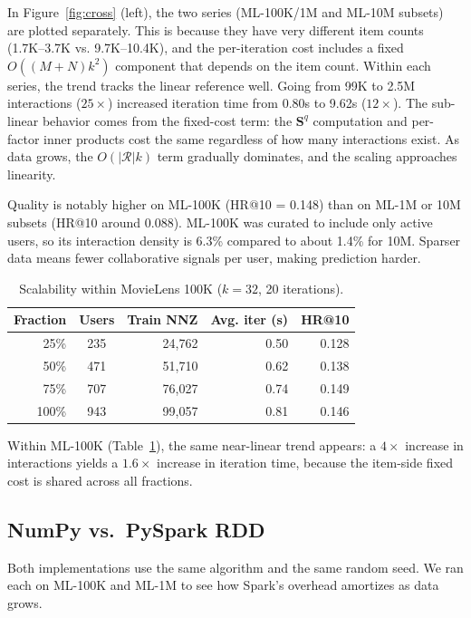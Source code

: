 \documentclass[11pt,a4paper]{article}
\begin{document}
In Figure~\ref{fig:cross} (left), the two series (ML-100K/1M and ML-10M subsets) are plotted separately. This is because they have very different item counts (1.7K--3.7K vs. 9.7K--10.4K), and the per-iteration cost includes a fixed $O((M+N)k^2)$ component that depends on the item count. Within each series, the trend tracks the linear reference well. Going from 99K to 2.5M interactions ($25\times$) increased iteration time from 0.80s to 9.62s ($12\times$). The sub-linear behavior comes from the fixed-cost term: the $\mathbf{S}^q$ computation and per-factor inner products cost the same regardless of how many interactions exist. As data grows, the $O(|\mathcal{R}|k)$ term gradually dominates, and the scaling approaches linearity.

Quality is notably higher on ML-100K (HR@10 = 0.148) than on ML-1M or 10M subsets (HR@10 around 0.088). ML-100K was curated to include only active users, so its interaction density is 6.3\% compared to about 1.4\% for 10M. Sparser data means fewer collaborative signals per user, making prediction harder.

\begin{table}[H]
\centering
\caption{Scalability within MovieLens 100K ($k=32$, 20 iterations).}
\label{tab:scale}
\begin{tabular}{rcrrr}
\toprule
Fraction & Users & Train NNZ & Avg. iter (s) & HR@10 \\
\midrule
25\% & 235 & 24{,}762 & 0.50 & 0.128 \\
50\% & 471 & 51{,}710 & 0.62 & 0.138 \\
75\% & 707 & 76{,}027 & 0.74 & 0.149 \\
100\% & 943 & 99{,}057 & 0.81 & 0.146 \\
\bottomrule
\end{tabular}
\end{table}

Within ML-100K (Table~\ref{tab:scale}), the same near-linear trend appears: a $4\times$ increase in interactions yields a $1.6\times$ increase in iteration time, because the item-side fixed cost is shared across all fractions.

\subsection{NumPy vs.\ PySpark RDD}

Both implementations use the same algorithm and the same random seed. We ran each on ML-100K and ML-1M to see how Spark's overhead amortizes as data grows.
\end{document}
